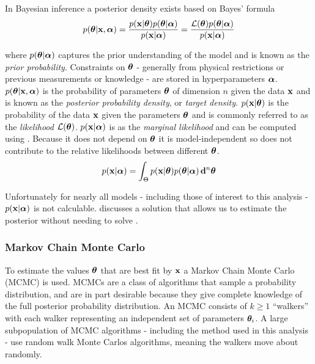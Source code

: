In Bayesian inference a posterior density exists based on Bayes' formula
\begin{equation}
p(\boldsymbol{\theta}|\mathbf{x}, \boldsymbol{\alpha}) = \frac{p(\mathbf{x}|\boldsymbol{\theta})
p(\boldsymbol{\theta}|\boldsymbol{\alpha})}{p(\mathbf{x}|\boldsymbol{\alpha})} = \frac{\mathcal{L}(\boldsymbol{\theta})
p(\boldsymbol{\theta}|\boldsymbol{\alpha})}{p(\mathbf{x}|\boldsymbol{\alpha})}
\end{equation}

\noindent where $p(\boldsymbol{\theta}|\boldsymbol{\alpha})$ captures the prior understanding of the model and is known as the
\textit{prior probability}.  Constraints on $\boldsymbol{\theta}$ - generally from physical restrictions or previous measurements or
knowledge - are stored in hyperparameters $\boldsymbol{\alpha}$.  $p(\boldsymbol{\theta}|\mathbf{x}, \boldsymbol{\alpha})$ is the probability of
parameters $\boldsymbol{\theta}$ of dimension $n$ given the
data $\mathbf{x}$ and is known as the \textit{posterior probability density}, or \textit{target
density}.  $p(\mathbf{x}|\boldsymbol{\theta})$ is the probability of the data $\mathbf{x}$ given the parameters
$\boldsymbol{\theta}$ and is
commonly referred to as the \textit{likelihood} $\mathcal{L}(\boldsymbol{\theta})$.  $p(\mathbf{x}|\boldsymbol{\alpha})$ is as the
\textit{marginal likelihood}
and can be computed using .  Because it does not depend on
$\boldsymbol{\theta}$ it is model-independent so does not contribute to the relative likelihoods between different
$\boldsymbol{\theta}$.
\begin{equation}
p(\mathbf{x}|\boldsymbol{\alpha}) = \int_{\Theta} p(\mathbf{x}|\boldsymbol{\theta}) p(\boldsymbol{\theta}|\boldsymbol{\alpha})\, \mathbf{d}^n \boldsymbol{\theta}
\label{eq:er_nr_calibrations_parameter_determ_mc_match_p_data}
\end{equation}

Unfortunately for nearly all models - including those of interest to this analysis - $p(\mathbf{x}|\boldsymbol{\alpha})$ is not
calculable.   discusses a solution that allows us to estimate the posterior
without needing to solve .



\subsubsection{Markov Chain Monte Carlo}
\label{subsubsec:er_nr_calibrations_parameter_determ_mcmc}
To estimate the values $\boldsymbol{\theta}$ that are best fit by $\mathbf{x}$ a Markov Chain Monte Carlo (MCMC) is used.  MCMCs
are a class of algorithms that sample a probability distribution, and are in part desirable because they
give complete knowledge of the full posterior probability
distribution.  An MCMC consists of $k \geq 1$ ``walkers'' with each walker representing an independent set of parameters
$\boldsymbol{\theta}_i$.  A large
subpopulation of MCMC algorithms - including the method used in this analysis - use random walk Monte Carlos algorithms, meaning the
walkers move about randomly.


